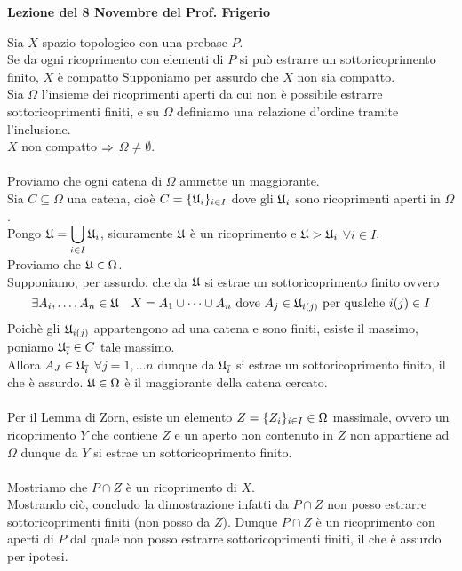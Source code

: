 

\textbf{Lezione del 8 Novembre del Prof. Frigerio}
\begin{thm}[di Alexander]\bianco
Sia $X$ spazio topologico con una prebase $P$.\\
Se da ogni ricoprimento con elementi di $P$ si pu\`o estrarre un sottoricoprimento finito, $X$ \`e compatto
\proof Supponiamo per assurdo che $X$ non sia compatto.\\
Sia $\Omega$ l'insieme dei ricoprimenti aperti da cui non \`e possibile estrarre sottoricoprimenti finiti, e su $\Omega$ definiamo una relazione d'ordine tramite l'inclusione.\\
$X$ non compatto $\Rightarrow$ $\Omega\neq \emptyset$.\\  \\
Proviamo che ogni catena di $\Omega$ ammette un maggiorante.\\
Sia $C \subseteq \Omega$ una catena, cio\`e $C= \displaystyle \{ \mathfrak{U}_i \}_{i\in I} $ dove gli $\mathfrak{U}_i$ sono ricoprimenti aperti in $\Omega$.\\
Pongo $\mathfrak{U}=\displaystyle \bigcup_{i \in I } \mathfrak{U}_i$, sicuramente $\mathfrak{U}$ \`e un ricoprimento e $\mathfrak{U} > \mathfrak{U}_i $ $\forall i \in I $.\\
Proviamo che $\mathfrak{U} \in \Omega$.\\
Supponiamo, per assurdo, che da $\mathfrak{U}$ si estrae un sottoricoprimento finito ovvero
$$ \exists A_i, \dots, A_n \in \mathfrak{U} \quad X = A_1 \cup \dots \cup A_n \text{ dove } A_j \in \mathfrak{U}_{i(j)} \text{ per qualche } i(j)\in I $$
Poich\`e gli $\mathfrak{U}_{i(j)}$ appartengono ad una catena e sono finiti, esiste il massimo, poniamo $\mathfrak{U}_{\overline{i}}\in C$ tale massimo.\\
Allora $A_J \in \mathfrak{U}_{\overline{i}}$ $\forall j=1, \dots n $ dunque da $\mathfrak{U}_{\overline{i}}$ si estrae un sottoricoprimento finito, il che \`e assurdo. $ \mathfrak{U} \in \Omega$ \`e il maggiorante della catena cercato.\\ \\
Per il Lemma di Zorn, esiste un elemento $\displaystyle Z =\{ Z_i\}_{i \in I } \in \Omega$ massimale, ovvero un ricoprimento $Y$ che contiene $Z$ e un aperto non contenuto in $Z$ non appartiene ad $\Omega$ dunque da $Y$ si estrae un sottoricoprimento finito.\\ \\
Mostriamo che $P \cap Z$ \`e un ricoprimento di $X$.\\
Mostrando ci\`o, concludo la dimostrazione  infatti da $P\cap Z$ non posso estrarre sottoricoprimenti finiti (non posso da $Z$). Dunque $P\cap Z $ \`e un ricoprimento con aperti di $P$ dal quale non posso estrarre sottoricoprimenti finiti, il che \`e assurdo per ipotesi.\\

\end{thm}
